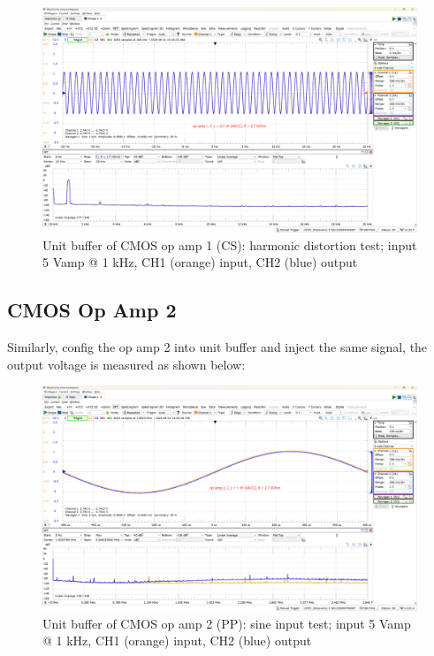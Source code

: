 \documentclass[UTF8]{article}
\begin{document}
\begin{figure}[H]\centering
    \includegraphics[width=\columnwidth]{LCE-06-07-运放设计/assets/op amp 1/unit 3.png}
    \caption{Unit buffer of CMOS op amp 1 (CS): harmonic distortion test; input 5 Vamp @ 1 kHz, CH1 (orange) input, CH2 (blue) output}
\end{figure}


\subsection{CMOS Op Amp 2}

Similarly, config the op amp 2 into unit buffer and inject the same signal, the output voltage is measured as shown below:

\begin{figure}[H]\centering
    \includegraphics[width=\columnwidth]{LCE-06-07-运放设计/assets/op amp 2/unit 1.png}
    \caption{Unit buffer of CMOS op amp 2 (PP): sine input test; input 5 Vamp @ 1 kHz, CH1 (orange) input, CH2 (blue) output}
\end{figure}
\end{document}
